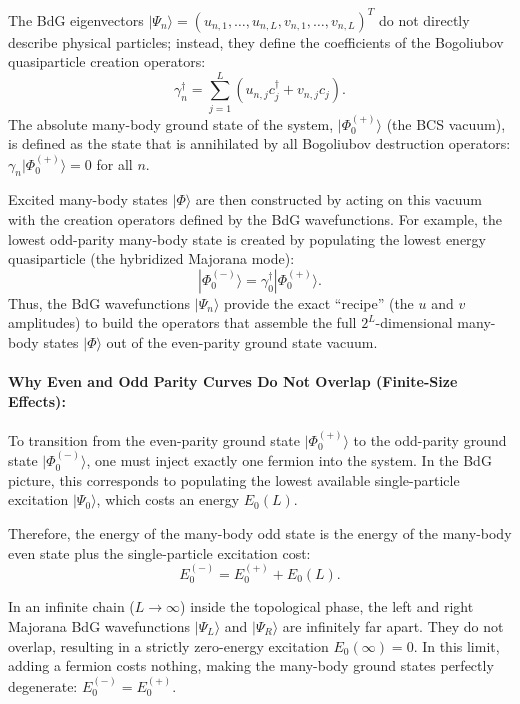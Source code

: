 \documentclass[11pt]{article}
\newcommand{\ket}[1]{|#1\rangle}
\begin{document}
The BdG eigenvectors $\ket{\Psi_n} = (u_{n,1}, \dots, u_{n,L}, v_{n,1}, \dots, v_{n,L})^T$ do not directly describe physical particles; instead, they define the coefficients of the Bogoliubov quasiparticle creation operators:
\begin{equation}
  \gamma_n^\dagger = \sum_{j=1}^L \left( u_{n,j} c_j^\dagger + v_{n,j} c_j \right).
\end{equation}
The absolute many-body ground state of the system, $\ket{\Phi_0^{(+)}}$ (the BCS vacuum), is defined as the state that is annihilated by all Bogoliubov destruction operators: $\gamma_n \ket{\Phi_0^{(+)}} = 0$ for all $n$.

Excited many-body states $\ket{\Phi}$ are then constructed by acting on this vacuum with the creation operators defined by the BdG wavefunctions. For example, the lowest odd-parity many-body state is created by populating the lowest energy quasiparticle (the hybridized Majorana mode):
\begin{equation}
  \ket{\Phi_0^{(-)}} = \gamma_0^\dagger \ket{\Phi_0^{(+)}}.
\end{equation}
Thus, the BdG wavefunctions $\ket{\Psi_n}$ provide the exact ``recipe'' (the $u$ and $v$ amplitudes) to build the operators that assemble the full $2^L$-dimensional many-body states $\ket{\Phi}$ out of the even-parity ground state vacuum.

\paragraph{Why Even and Odd Parity Curves Do Not Overlap (Finite-Size Effects):}
To transition from the even-parity ground state $\ket{\Phi_0^{(+)}}$ to the odd-parity ground state $\ket{\Phi_0^{(-)}}$, one must inject exactly one fermion into the system. In the BdG picture, this corresponds to populating the lowest available single-particle excitation $\ket{\Psi_0}$, which costs an energy $E_0(L)$.

Therefore, the energy of the many-body odd state is the energy of the many-body even state plus the single-particle excitation cost:
\begin{equation}
  E_0^{(-)} = E_0^{(+)} + E_0(L).
\end{equation}

In an infinite chain ($L \to \infty$) inside the topological phase, the left and right Majorana BdG wavefunctions $\ket{\Psi_L}$ and $\ket{\Psi_R}$ are infinitely far apart. They do not overlap, resulting in a strictly zero-energy excitation $E_0(\infty) = 0$. In this limit, adding a fermion costs nothing, making the many-body ground states perfectly degenerate: $E_0^{(-)} = E_0^{(+)}$.
\end{document}
